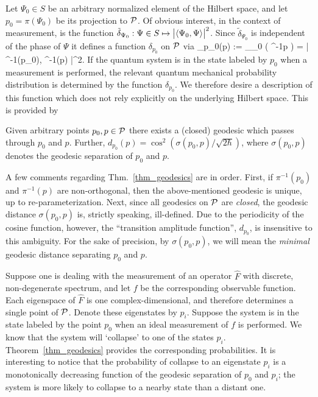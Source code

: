Let $\Psi_0 \in S$ be an arbitrary normalized element of the Hilbert
space, and let $p_0 = \pi(\Psi_0)$ be its projection to $\P$. Of
obvious interest, in the context of measurement, is the function
$\tilde{\delta}_{\Psi_0} :\Psi\in S \mapsto \big| \< \Psi_0 , \Psi \>
\big|^2$.  Since $\tilde{\delta}_{\Psi_0}$ is independent of the phase of
$\Psi$ it defines a function $\delta_{p_0}$ on $\P$ via
%
\be
\delta_{p_0}(p) := \tilde{\delta}_{\Psi_0} ( \pi^{-1}p )
= \big| \< \pi^{-1}(p_0),  \pi^{-1}(p) \> \big|^2.
\ee
%
If the quantum system is in the state labeled by $p_0$ when a
measurement is performed, the relevant quantum mechanical probability
distribution is determined by the function $\delta_{p_0}$.  We
therefore desire a description of this function which does not rely
explicitly on the underlying Hilbert space.  This is provided by
%
\begin{theorem}\label{thm_geodesics}
Given arbitrary points $p_0, p \in \P$ there exists a (closed)
geodesic which passes through $p_0$ and $p$. Further, $d_{p_0}(p) =
\cos^2\left( \sigma(p_0, p) / \sqrt{2\hbar} \right)$, where
$\sigma(p_0, p)$ denotes the geodesic separation of $p_0$ and $p$.
\end{theorem}

A few comments regarding Thm.~\ref{thm_geodesics} are in order.
First, if $\pi^{-1}(p_0)$ and $\pi^{-1}(p)$ are non-orthogonal, then
the above-mentioned geodesic is unique, up to re-parameterization.
Next, since all geodesics on $\P$ are {\em closed}, the geodesic
distance $\sigma(p_0, p)$ is, strictly speaking, ill-defined.  Due to
the periodicity of the cosine function, however, the ``transition
amplitude function'', $d_{p_0}$, is insensitive to this ambiguity.
For the sake of precision, by $\sigma(p_0, p)$, we will mean the {\em
minimal} geodesic distance separating $p_0$ and $p$.

Suppose one is dealing with the measurement of an operator $\hat{F}$
with discrete, non-degenerate spectrum, and let $f$ be the
corresponding observable function.  Each eigenspace of $\hat{F}$ is
one complex-dimensional, and therefore determines a single point of
 $\P$.  Denote these eigenstates by $p_i$.  Suppose the system is in
the state labeled by the point $p_0$ when an ideal measurement of $f$
is performed.  We know that the system will `collapse' to one of the
states $p_i$.  Theorem~\ref{thm_geodesics} provides the corresponding
probabilities.  It is interesting to notice that the probability of
collapse to an eigenstate $p_i$ is a monotonically decreasing function
of the geodesic separation of $p_0$ and $p_i$; the system is more
likely to collapse to a nearby state than a distant one.

